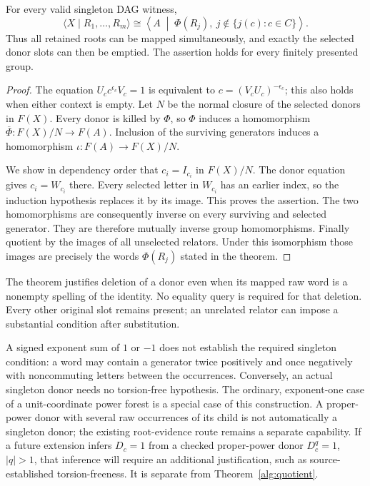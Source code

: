 \begin{theorem}
\label{alg:quotient}
For every valid singleton DAG witness,
\[
 \langle X\mid R_1,\ldots,R_m\rangle
 \cong
 \left\langle A\;\middle|\;
   \Phi(R_j),\ j\notin\{j(c):c\in C\}\right\rangle.
\]
Thus all retained roots can be mapped simultaneously, and exactly the
selected donor slots can then be emptied. The assertion holds for every
finitely presented group.
\end{theorem}

\begin{proof}
The equation $U_c c^{\epsilon_c}V_c=1$ is equivalent to
$c=(V_cU_c)^{-\epsilon_c}$; this also holds when either context is empty.
Let $N$ be the normal closure of the selected donors in $F(X)$. Every
donor is killed by $\Phi$, so $\Phi$ induces a homomorphism
$\overline\Phi:F(X)/N\to F(A)$. Inclusion of the surviving generators
induces a homomorphism $\iota:F(A)\to F(X)/N$.

We show in dependency order that $c_i=I_{c_i}$ in $F(X)/N$. The donor
equation gives $c_i=W_{c_i}$ there. Every selected letter in $W_{c_i}$
has an earlier index, so the induction hypothesis replaces it by its
image. This proves the assertion. The two homomorphisms are consequently
inverse on every surviving and selected generator. They are therefore
mutually inverse group homomorphisms. Finally quotient by the images
of all unselected relators. Under this isomorphism those images are
precisely the words $\Phi(R_j)$ stated in the theorem.
\end{proof}

The theorem justifies deletion of a donor even when its mapped raw word
is a nonempty spelling of the identity. No equality query is required for
that deletion. Every other original slot remains present; an unrelated
relator can impose a substantial condition after substitution.

\begin{remark}
\label{alg:raw-scope}
A signed exponent sum of $1$ or $-1$ does not establish the required
singleton condition: a word may contain a generator twice positively
and once negatively with noncommuting letters between the occurrences.
Conversely, an actual singleton donor needs no torsion-free hypothesis.
The ordinary, exponent-one case of a unit-coordinate power forest is
a special case of this construction. A proper-power donor with several
raw occurrences of its child is not automatically a singleton donor;
the existing root-evidence route remains a separate capability.
If a future extension infers $D_c=1$ from a checked proper-power donor
$D_c^q=1$, $|q|>1$, that inference will require an additional justification,
such as source-established torsion-freeness. It is separate from
Theorem~\ref{alg:quotient}.
\end{remark}

